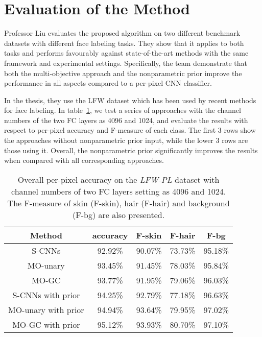 \documentclass[twocolumn]{article}
\begin{document}
 \section{Evaluation of the Method}
   Professor Liu evaluates the proposed algorithm on two different benchmark datasets with different face labeling tasks. They show that it applies to both tasks and performs favourably against state-of-the-art methods with the same framework and experimental settings. Specifically, the team demonstrate that both the multi-objective approach and the nonparametric prior improve the performance in all aspects compared to a per-pixel CNN classifier.
   
   In the thesis, they use the LFW dataset which has been used by recent methods for face labeling. In table~\ref{LFW}, we test a series of approaches with the channel numbers of the two FC layers as 4096 and 1024, and evaluate the results with respect to per-pixel accuracy and F-measure of each class. The first 3 rows show the approaches without nonparametric prior input, while the lower 3 rows are those using it. Overall, the nonparametric prior significantly improves the results when compared with all corresponding approaches.
   \begin{table}[h]
   	\centering
   	\caption{Overall per-pixel accuracy on the \emph{LFW-PL} dataset with
   		channel numbers of two FC layers setting as 4096 and 1024. The
   		F-measure of skin (F-skin), hair (F-hair) and background (F-bg)
   		are also presented.}\label{LFW}
   	\begin{tabular}{|c|c|c|c|c|}
   		\hline
   		Method & accuracy & F-skin & F-hair & F-bg\\
   		\hline
   		S-CNNs  &92.92\% &90.07\%& 73.73\%&95.18\%\\
   		\hline
   		MO-unary &93.45\%&91.45\%&78.03\%& 95.84\%\\
   		\hline
   		MO-GC &93.77\%&91.95\%& 79.06\%& 96.03\%\\
   		\hline
   		S-CNNs with prior&94.25\%&92.79\%& 77.18\%& 96.63\%\\
   		\hline
   		MO-unary with prior &94.94\%&93.64\%& 79.95\%& 97.02\%\\
   		\hline
   	    MO-GC with prior&95.12\%&93.93\%& 80.70\%&97.10\%\\
   		\hline
   	\end{tabular}
   \end{table}
  

	
\end{document}
